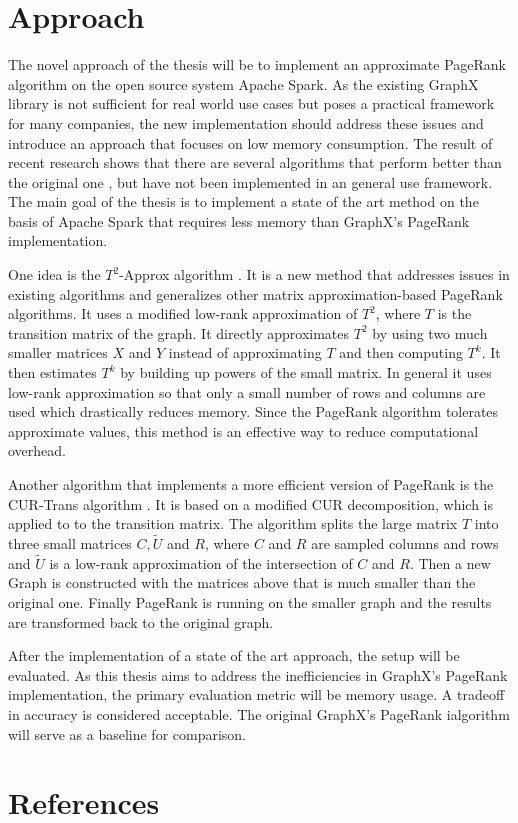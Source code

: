 \documentclass[a4paper,12pt]{article}
\begin{document}
\begin{multicols}{2}
\section{Approach}
The novel approach of the thesis will be to implement an approximate PageRank algorithm on the open source system Apache Spark. As the existing GraphX library is not sufficient for real world use cases but poses a practical framework for many companies, the new implementation should address these issues and introduce an approach that focuses on low memory consumption. 
The result of recent research shows that there are several algorithms that perform better than the original one \cite{wu_efficient_2024}, but have not been implemented in an general use framework. The main goal of the thesis is to implement a state of the art method on the basis of Apache Spark that requires less memory than GraphX's PageRank implementation. 

One idea is the $T^2$-Approx algorithm \cite{wu_efficient_2024}. It is a new method that addresses issues in existing algorithms and generalizes other matrix approximation-based PageRank algorithms. It uses a modified low-rank approximation of $T^2$, where $T$ is the transition matrix of the graph. It directly approximates $T^2$ by using two much smaller matrices $X$ and $Y$ instead of approximating $T$ and then computing $T^k$. It then estimates $T^k$ by building up powers of the small matrix. In general it uses low-rank approximation so that only a small number of rows and columns are used which drastically reduces memory. Since the PageRank algorithm tolerates approximate values, this method is an effective way to reduce computational overhead.

Another algorithm that implements a more efficient version of PageRank is the CUR-Trans algorithm \cite{wu_efficient_2024}. It is based on a modified CUR decomposition, which is applied to to the transition matrix. The algorithm splits the large matrix $T$ into three small matrices $C, \tilde{U}$ and $R$, where $C$ and $R$ are sampled columns and rows and $\tilde{U}$ is a low-rank approximation of the intersection of $C$ and $R$. Then a new Graph is constructed with the matrices above that is much smaller than the original one. Finally PageRank is running on the smaller graph and the results are transformed back to the original graph.

After the implementation of a state of the art approach, the setup will be evaluated. As this thesis aims to address the inefficiencies in GraphX's PageRank implementation, the primary evaluation metric will be memory usage. A tradeoff in accuracy is considered acceptable. The original GraphX's PageRank ialgorithm will serve as a baseline for comparison.



\section{References}

\end{multicols}
\end{document}
